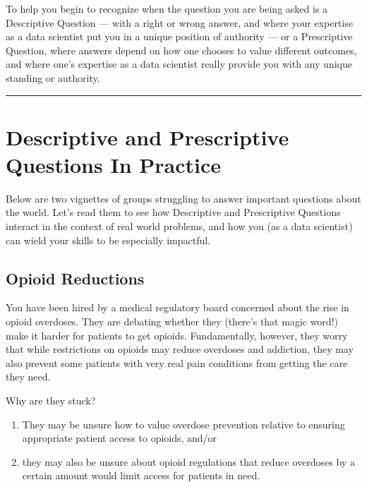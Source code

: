 \documentclass[letterpaper,10pt,english]{jupyterBook}
\begin{document}
\sphinxAtStartPar
To help you begin to recognize when the question you are being asked is a Descriptive Question — with a right or wrong answer, and where your expertise as a data scientist put you in a unique position of authority — or a Prescriptive Question, where answers depend on how one chooses to value different outcomes, and where one’s expertise as a data scientist really  provide you with any unique standing or authority.


\bigskip\hrule\bigskip


\sphinxstepscope


\section{Descriptive and Prescriptive Questions In Practice}
\label{\detokenize{30_questions/06_descriptive_prescriptive_examples:descriptive-and-prescriptive-questions-in-practice}}\label{\detokenize{30_questions/06_descriptive_prescriptive_examples::doc}}
\sphinxAtStartPar
Below are two vignettes of groups struggling to answer important questions about the world. Let’s read them to see how Descriptive and Prescriptive Questions interact in the context of real world problems, and how you (as a data scientist) can wield your skills to be especially impactful.


\subsection{Opioid Reductions}
\label{\detokenize{30_questions/06_descriptive_prescriptive_examples:opioid-reductions}}
\sphinxAtStartPar
You have been hired by a medical regulatory board concerned about the rise in opioid overdoses. They are debating whether they  (there’s that magic word!) make it harder for patients to get opioids. Fundamentally, however, they worry that while restrictions on opioids may reduce overdoses and addiction, they may also prevent some patients with very real pain conditions from getting the care they need.

\sphinxAtStartPar
Why are they stuck?
\begin{enumerate}
%
\item {} 
\sphinxAtStartPar
They may be unsure how to value overdose prevention relative to ensuring appropriate patient access to opioids, and/or

\item {} 
\sphinxAtStartPar
they may also be unsure about  opioid regulations that reduce overdoses by a certain amount would limit access for patients in need.

\end{enumerate}
\end{document}
